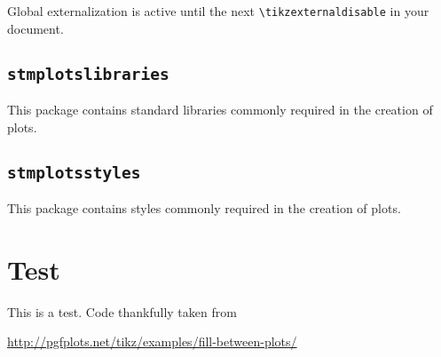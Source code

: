 \documentclass[%
  type=article,%
  layout=koma,%
  date=true,%
  hyperref=true,%
  listings=true,%
  math=true,%
  plots=false,%
]{stmtext}
\begin{document}
Global externalization is active until the next \texttt{\textbackslash tikzexternaldisable} in your document.

\subsection{\protect\texttt{stmplotslibraries}}
\label{sec:usage:preamble:libraries}


This package contains standard libraries commonly required in the creation of plots.


\subsection{\protect\texttt{stmplotsstyles}}
\label{sec:usage:preamble:styles}


This package contains styles commonly required in the creation of plots.


\section{Test}

This is a test. Code thankfully taken from

\href{http://pgfplots.net/tikz/examples/fill-between-plots/}{http://pgfplots.net/tikz/examples/fill-between-plots/}
\end{document}
